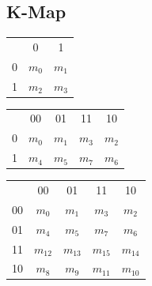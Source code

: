\documentclass[a4paper]{article}
\begin{document}
\subsection{K-Map}
\begin{center}
\begin{minipage}[c]{0.2\textwidth}
\begin{table}[H]
\centering
\begin{tabular}{ccc}
 & 0 & 1 \\ \cline{2-3} 
\multicolumn{1}{c|}{0} & \multicolumn{1}{c|}{$m_0$} & \multicolumn{1}{c|}{$m_1$} \\ \cline{2-3} 
\multicolumn{1}{c|}{1} & \multicolumn{1}{c|}{$m_2$} & \multicolumn{1}{c|}{$m_3$} \\ \cline{2-3} 
\end{tabular}
\end{table}
\end{minipage}
\begin{minipage}[c]{0.35\textwidth}
\begin{table}[H]
\centering
\begin{tabular}{ccccc}
 & 00 & 01 & 11 & 10 \\ \cline{2-5} 
\multicolumn{1}{c|}{0} & \multicolumn{1}{c|}{$m_0$} & \multicolumn{1}{c|}{$m_1$} & \multicolumn{1}{c|}{$m_3$} & \multicolumn{1}{c|}{$m_2$} \\ \cline{2-5} 
\multicolumn{1}{c|}{1} & \multicolumn{1}{c|}{$m_4$} & \multicolumn{1}{c|}{$m_5$} & \multicolumn{1}{c|}{$m_7$} & \multicolumn{1}{c|}{$m_6$} \\ \cline{2-5} 
\end{tabular}
\end{table}
\end{minipage}
\begin{minipage}[c]{0.3\textwidth}
\begin{table}[H]
\centering
\begin{tabular}{ccccc}
 & 00 & 01 & 11 & 10 \\ \cline{2-5} 
\multicolumn{1}{c|}{00} & \multicolumn{1}{c|}{$m_0$} & \multicolumn{1}{c|}{$m_1$} & \multicolumn{1}{c|}{$m_3$} & \multicolumn{1}{c|}{$m_2$} \\ \cline{2-5} 
\multicolumn{1}{c|}{01} & \multicolumn{1}{c|}{$m_4$} & \multicolumn{1}{c|}{$m_5$} & \multicolumn{1}{c|}{$m_7$} & \multicolumn{1}{c|}{$m_6$} \\ \cline{2-5} 
\multicolumn{1}{c|}{11} & \multicolumn{1}{c|}{$m_{12}$} & \multicolumn{1}{c|}{$m_{13}$} & \multicolumn{1}{c|}{$m_{15}$} & \multicolumn{1}{c|}{$m_{14}$} \\ \cline{2-5} 
\multicolumn{1}{c|}{10} & \multicolumn{1}{c|}{$m_8$} & \multicolumn{1}{c|}{$m_9$} & \multicolumn{1}{c|}{$m_{11}$} & \multicolumn{1}{c|}{$m_{10}$} \\ \cline{2-5} 
\end{tabular}
\end{table}
\end{minipage}
\end{center}
\end{document}
